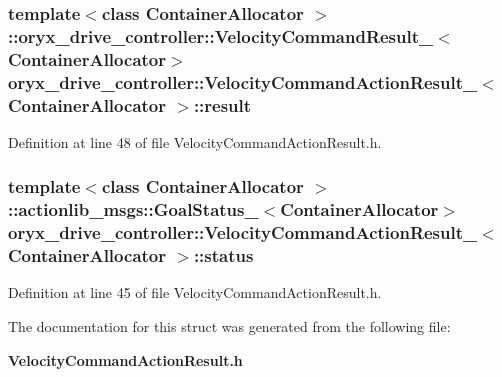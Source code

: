 \subsubsection[{result}]{\setlength{\rightskip}{0pt plus 5cm}template$<$class Container\-Allocator $>$ \-::{\bf oryx\-\_\-drive\-\_\-controller\-::\-Velocity\-Command\-Result\-\_\-}$<$\-Container\-Allocator$>$ {\bf oryx\-\_\-drive\-\_\-controller\-::\-Velocity\-Command\-Action\-Result\-\_\-}$<$ \-Container\-Allocator $>$\-::{\bf result}}\label{structoryx__drive__controller_1_1VelocityCommandActionResult___ada56d72a754bb1baaa682adedaabd055}


\-Definition at line 48 of file \-Velocity\-Command\-Action\-Result.\-h.

\subsubsection[{status}]{\setlength{\rightskip}{0pt plus 5cm}template$<$class Container\-Allocator $>$ \-::actionlib\-\_\-msgs\-::\-Goal\-Status\-\_\-$<$\-Container\-Allocator$>$ {\bf oryx\-\_\-drive\-\_\-controller\-::\-Velocity\-Command\-Action\-Result\-\_\-}$<$ \-Container\-Allocator $>$\-::{\bf status}}\label{structoryx__drive__controller_1_1VelocityCommandActionResult___a5aeb1efaf855bf5ba94894188765fe17}


\-Definition at line 45 of file \-Velocity\-Command\-Action\-Result.\-h.



\-The documentation for this struct was generated from the following file\-:\begin{DoxyCompactItemize}
\item 
{\bf \-Velocity\-Command\-Action\-Result.\-h}\end{DoxyCompactItemize}
